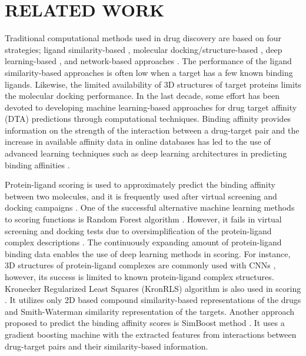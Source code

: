\chapter{RELATED WORK}
\label{related_work}

Traditional computational methods used in drug discovery are based on four strategies; ligand similarity-based \cite{keiser2007relating}, molecular docking/structure-based \cite{morris2009autodock4,donald2011algorithms}, deep learning-based \cite{wan2018neodti, luo2017network}, and network-based approaches \cite{luo2017network, zheng2013collaborative, chen2012drug, wang2014drug}. The performance of the ligand similarity-based approaches is often low when a target has a few known binding ligands. Likewise, the limited availability of 3D structures of target proteins limits the molecular docking performance. In the last decade, some effort has been devoted to developing machine learning-based approaches for drug target affinity (DTA) predictions through computational techniques. Binding affinity provides information on the strength of the interaction between a drug-target pair and the increase in available affinity data in online databases has led to the use of advanced learning techniques such as deep learning architectures in predicting binding affinities \cite{chan2016large, tian2016boosting, hamanaka2017cgbvs}.

Protein-ligand scoring is used to approximately predict the binding affinity between two molecules, and it is frequently used after virtual screening and docking campaigns \cite{ragoza2017protein}. One of the successful alternative machine learning methods to scoring functions is Random Forest algorithm \cite{ballester2010machine, shar2016pred}. However, it fails in virtual screening and docking tests due to oversimplification of the protein-ligand complex descriptions \cite{gabel2014beware}. The continuously expanding amount of protein-ligand binding data enables the use of deep learning methods in scoring. For instance, 3D structures of protein-ligand complexes are commonly used with CNNs \cite{gomes2017atomic, ragoza2017protein, wallach2015atomnet}, however, its success is limited to known protein-ligand complex structures. Kronecker Regularized Least Squares (KronRLS) algorithm is also used in scoring \cite{pahikkala2014toward}. It utilizes only 2D based compound similarity-based representations of the drugs and Smith-Waterman similarity representation of the targets. Another approach proposed to predict the binding affinity scores is SimBoost method \cite{he2017simboost}. It uses a gradient boosting machine with the extracted features from interactions between drug-target pairs and their similarity-based information. 

